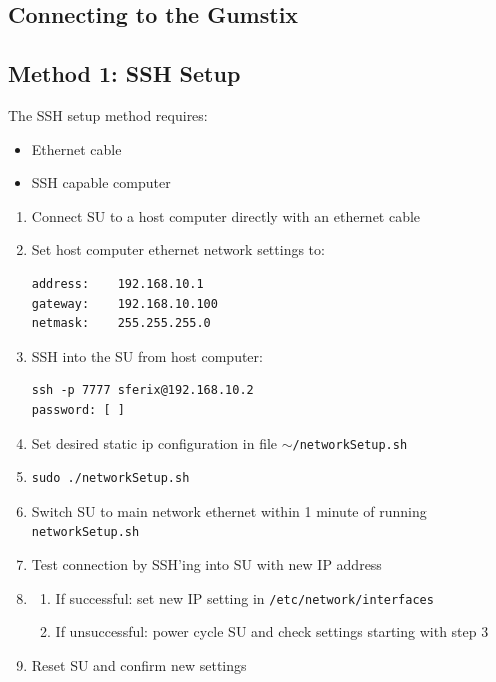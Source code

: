 \subsection{Connecting to the Gumstix}
\label{app:appendix:setup}

\subsection*{Method 1: SSH Setup}
The SSH setup method requires:
\begin{itemize}
\item{Ethernet cable}
\item{SSH capable computer}
\end{itemize}

\begin{enumerate}
\item{Connect SU to a host computer directly with an ethernet cable}
\item{Set host computer ethernet network settings to:
\begin{verbatim}
address:	192.168.10.1
gateway:	192.168.10.100
netmask:	255.255.255.0
\end{verbatim}}
\item{SSH into the SU from host computer:
\begin{verbatim}
ssh -p 7777 sferix@192.168.10.2
password: [	]
\end{verbatim}}
\item{Set desired static ip configuration in file \texttt{$\sim$/networkSetup.sh}}
\item{\begin{verbatim}
sudo ./networkSetup.sh
\end{verbatim}}
\item{Switch SU to main network ethernet within 1 minute of running \texttt{networkSetup.sh}}
\item{Test connection by SSH'ing into SU with new IP address}
\item{
\begin{enumerate}
\item{If successful: set new IP setting in \texttt{/etc/network/interfaces}}
\item{If unsuccessful: power cycle SU and check settings starting with step 3}
\end{enumerate}}
\item{Reset SU and confirm new settings}
\end{enumerate}

